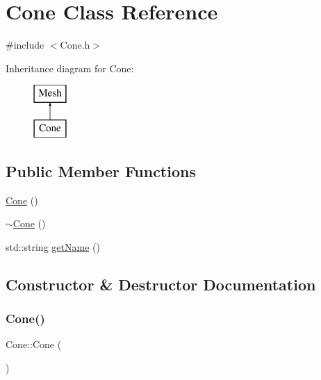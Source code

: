 \hypertarget{class_cone}{}\section{Cone Class Reference}
\label{class_cone}


{\ttfamily \#include $<$Cone.\+h$>$}

Inheritance diagram for Cone\+:\begin{figure}[H]
\begin{center}
\leavevmode
\includegraphics[height=2.000000cm]{class_cone}
\end{center}
\end{figure}
\subsection*{Public Member Functions}
\begin{DoxyCompactItemize}
\item 
\mbox{\hyperlink{class_cone_aec709e915b3271a750d420b14b215bfb}{Cone}} ()
\item 
\mbox{\hyperlink{class_cone_a36a6a946043f7b24a34e42cb88b5a4e8}{$\sim$\+Cone}} ()
\item 
std\+::string \mbox{\hyperlink{class_cone_a9581010134e3d1fe079fe5cce1933786}{get\+Name}} ()
\end{DoxyCompactItemize}


\subsection{Constructor \& Destructor Documentation}
\mbox{\label{class_cone_aec709e915b3271a750d420b14b215bfb}} 
\subsubsection{\texorpdfstring{Cone()}{Cone()}}
{\footnotesize\ttfamily Cone\+::\+Cone (\begin{DoxyParamCaption}{ }\end{DoxyParamCaption})}

\mbox{\label{class_cone_a36a6a946043f7b24a34e42cb88b5a4e8}} 
